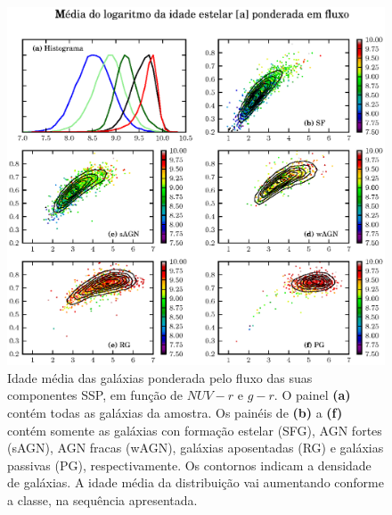 \begin{figure}
	\includegraphics{figuras/uvcolor-color-at_flux-byclass.eps}
	\caption[Idade média das galáxias ponderada em fluxo no diagrama cor--cor UV.]
	{Idade média das galáxias ponderada pelo fluxo das suas componentes SSP, em
	função de $NUV-r$ e $g-r$. O painel \textbf{(a)} contém todas as galáxias da
	amostra. Os painéis de \textbf{(b)} a \textbf{(f)} contém somente as galáxias
	con formação estelar (SFG), AGN fortes (sAGN), AGN fracas (wAGN), galáxias
	aposentadas (RG) e galáxias passivas (PG), respectivamente. Os contornos
	indicam a densidade de galáxias. A idade média da distribuição vai aumentando
	conforme a classe, na sequência apresentada.}
	\label{fig:ATFluxColor}
\end{figure}

